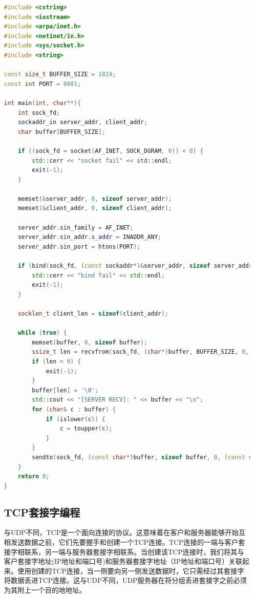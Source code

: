 \begin{lstlisting}[language=C++, caption={udp server code}]
#include <cstring>
#include <iostream>
#include <arpa/inet.h>
#include <netinet/in.h>
#include <sys/socket.h>
#include <string>

const size_t BUFFER_SIZE = 1024;
const int PORT = 8081;

int main(int, char**){
    int sock_fd;
    sockaddr_in server_addr, client_addr;
    char buffer[BUFFER_SIZE];

    if ((sock_fd = socket(AF_INET, SOCK_DGRAM, 0)) < 0) {
        std::cerr << "socket fail" << std::endl;
        exit(-1);
    }

    memset(&server_addr, 0, sizeof server_addr);
    memset(&client_addr, 0, sizeof client_addr);

    server_addr.sin_family = AF_INET;
    server_addr.sin_addr.s_addr = INADDR_ANY;
    server_addr.sin_port = htons(PORT);

    if (bind(sock_fd, (const sockaddr*)&server_addr, sizeof server_addr) < 00) {
        std::cerr << "bind fail" << std::endl;
        exit(-1);
    }

    socklen_t client_len = sizeof(client_addr);

    while (true) {
        memset(buffer, 0, sizeof buffer);
        ssize_t len = recvfrom(sock_fd, (char*)buffer, BUFFER_SIZE, 0, (sockaddr*)&client_addr, &client_len);
        if (len < 0) {
            exit(-1);
        }
        buffer[len] = '\0';
        std::cout << "[SERVER RECV]: " << buffer << "\n";
        for (char& c : buffer) {
            if (islower(c)) {
                c = toupper(c);
            }
        }
        sendto(sock_fd, (const char*)buffer, sizeof buffer, 0, (const sockaddr*)&client_addr, client_len);
    }
    return 0;
}    
\end{lstlisting}

\subsection{TCP套接字编程}

    与UDP不同，TCP是一个面向连接的协议。这意味着在客户和服务器能够开始互相发送数据之前，它们先要握手和创建一个TCP连接。TCP连接的一端与客户套接字相联系，另一端与服务器套接字相联系。当创建该TCP连接时，我们将其与客户套接字地址(IP地址和端口号)和服务器套接字地址（IP地址和端口号）关联起来。使用创建的TCP连接，当一侧要向另一侧发送数据时，它只需经过其套接字将数据丢进TCP连接。这与UDP不同，UDP服务器在将分组丢进套接字之前必须为其附上一个目的地地址。

